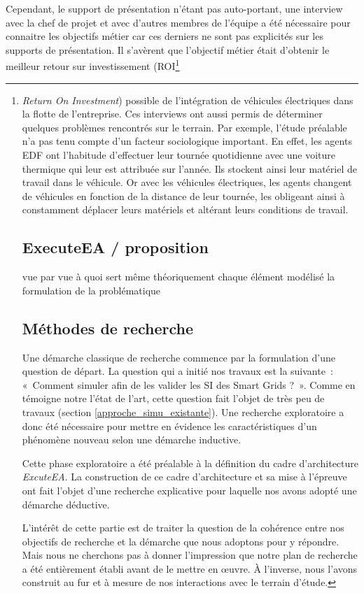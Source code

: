 Cependant, le support de présentation n'étant pas auto-portant, une interview 
avec la chef de projet et avec d'autres membres de l'équipe a été nécessaire 
pour connaitre les objectifs métier car ces derniers ne sont pas explicités sur 
les supports de présentation. Il s'avèrent que l'objectif métier était d'obtenir 
le meilleur retour sur investissement (ROI\footnote{\textit{Return On 
Investment}) possible de l'intégration de véhicules électriques dans la flotte 
de l'entreprise. Ces interviews ont aussi permis de déterminer quelques 
problèmes rencontrés sur le terrain. Par exemple, l'étude préalable n'a pas tenu 
compte d'un facteur sociologique important. En effet, les agents EDF ont 
l'habitude d'effectuer leur tournée quotidienne avec une voiture thermique qui 
leur est attribuée sur l'année. Ils stockent ainsi leur matériel de travail dans 
le véhicule. Or avec les véhicules électriques, les agents changent de véhicules 
en fonction de la distance de leur tournée, les obligeant ainsi à constamment 
déplacer leurs matériels et altérant leurs conditions de travail.   

\section{ExecuteEA / proposition}
vue par vue 
à quoi sert même théoriquement chaque élément modélisé 
la formulation de la problématique 

\section{Méthodes de recherche}
Une démarche classique de recherche commence par la formulation d'une question 
de départ. La question qui a initié nos travaux est la suivante~: «~Comment 
simuler afin de les valider les SI des Smart Grids ?~».  Comme en témoigne notre 
l'état de l'art, cette question fait l'objet de très peu de travaux (section 
\ref{approche_simu_existante}). Une recherche exploratoire a donc été nécessaire 
pour mettre en évidence les caractéristiques d'un phénomène nouveau selon une 
démarche inductive. 

Cette phase exploratoire a été préalable à la définition du cadre d'architecture 
\textit{ExcuteEA}. La construction de ce cadre d'architecture et sa mise à 
l'épreuve ont fait l'objet d'une recherche explicative pour laquelle nos avons 
adopté une démarche déductive.

L'intérêt de cette partie est de traiter la question de la cohérence entre nos 
objectifs de recherche et la démarche que nous adoptons pour y répondre. Mais 
nous ne cherchons pas à donner l'impression que notre plan de recherche a été 
entièrement établi avant de le mettre en œuvre. À l'inverse, nous l'avons 
construit au fur et à mesure de nos interactions avec le terrain d'étude. 

}
